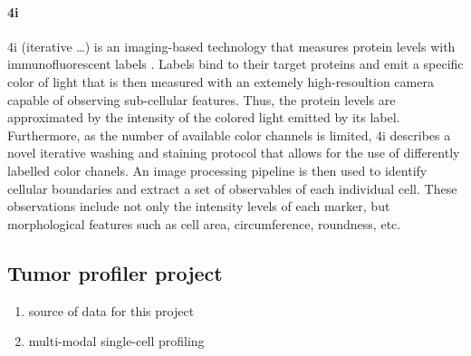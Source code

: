 \paragraph{4i}
4i (iterative \ldots) %
is an imaging-based technology that measures protein levels with immunofluorescent labels \cite{gabri}. %
Labels bind to their target proteins and emit a specific color of light
that is then measured with an extemely high-resoultion camera capable of observing sub-cellular features.
Thus, the protein levels are approximated by the intensity of the colored light emitted by its label.
Furthermore, as the number of available color channels is limited,
4i describes a novel iterative washing and staining protocol that allows for the use of differently labelled color chanels.
An image processing pipeline is then used to identify cellular boundaries and extract a set of observables of each individual cell.
These observations include not only the intensity levels of each marker, but morphological features such as cell area, circumference, roundness, etc.

\subsection{Tumor profiler project}
\begin{enumerate}
  \item source of data for this project
  \item multi-modal single-cell profiling
\end{enumerate}



